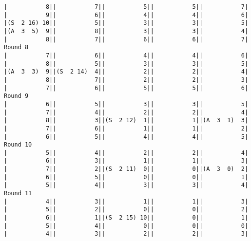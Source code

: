 \begin{verbatim}
|           8||           7||           5||           5||           7|
|           9||           6||           4||           4||           6|
|(S  2 16) 10||           5||           3||           3||           5|
|(A  3  5)  9||           8||           3||           3||           4|
|           8||           7||           6||           6||           7|
Round 8
|           7||           6||           4||           4||           6|
|           8||           5||           3||           3||           5|
|(A  3  3)  9||(S  2 14)  4||           2||           2||           4|
|           8||           7||           2||           2||           3|
|           7||           6||           5||           5||           6|
Round 9
|           6||           5||           3||           3||           5|
|           7||           4||           2||           2||           4|
|           8||           3||(S  2 12)  1||           1||(A  3  1)  3|
|           7||           6||           1||           1||           2|
|           6||           5||           4||           4||           5|
Round 10
|           5||           4||           2||           2||           4|
|           6||           3||           1||           1||           3|
|           7||           2||(S  2 11)  0||           0||(A  3  0)  2|
|           6||           5||           0||           0||           1|
|           5||           4||           3||           3||           4|
Round 11
|           4||           3||           1||           1||           3|
|           5||           2||           0||           0||           2|
|           6||           1||(S  2 15) 10||           0||           1|
|           5||           4||           0||           0||           0|
|           4||           3||           2||           2||           3|
\end{verbatim}
